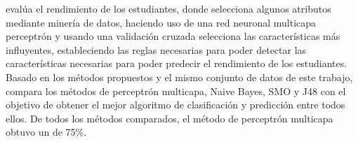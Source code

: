 \textcite{borkar2014attributes} evalúa el rendimiento de los estudiantes, donde selecciona algunos atributos mediante minería de datos, haciendo uso de una red neuronal multicapa perceptrón y usando una validación cruzada selecciona las características más influyentes, estableciendo las reglas necesarias para poder detectar las características necesarias para poder predecir el rendimiento de los estudiantes. Basado en los métodos propuestos y el mismo conjunto de datos de este trabajo, \textcite{jayakameswaraiah2014study} compara los métodos de perceptrón multicapa, Naive Bayes, SMO y J48 con el objetivo de obtener el mejor algoritmo de clasificación y predicción entre todos ellos. De todos los métodos comparados, el método de perceptrón multicapa obtuvo un  de 75\%.






